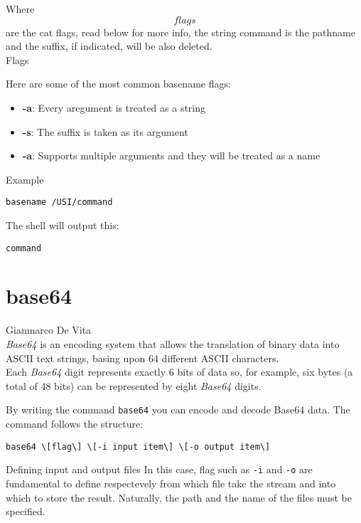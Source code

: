 \documentclass[hidelinks,12pt,a4paper,numbers=enddot]{scrartcl}
\begin{document}
Where \[flags\] are the cat flags, read below for more info, the string command is
the pathname and the suffix, if indicated, will be also deleted.\\

Flags

Here are some of the most common basename flags:

\begin{itemize}
    \item \textbf{-a}: Every aregument is treated as a string 
    \item \textbf{-s}: The suffix is taken as its argument  
    \item \textbf{-a}: Supports multiple arguments and they will be treated as a name 
\end{itemize}

Example

\begin{verbatim}
basename /USI/command
\end{verbatim}

The shell will output this:

\begin{verbatim}
command
\end{verbatim}

\section{base64}


\large Gianmarco De Vita \normalsize\\



\emph{Base64} is an encoding system that allows the translation of binary
data into ASCII text strings, basing upon 64 different ASCII characters.\\
Each \emph{Base64} digit represents exactly 6 bits of data so, for example,
six bytes (a total of 48 bits) can be represented by eight \emph{Base64} digits.

By writing the command \texttt{base64} you can encode and decode Base64 data.
The command follows the structure:

\begin{verbatim}
base64 \[flag\] \[-i input item\] \[-o output item\]
\end{verbatim}

Defining input and output files
In this case, flag such as \texttt{-i} and \texttt{-o} are fundamental
to define respectevely from which file take the stream and into which to store
the result. Naturally, the path and the name of the files must be specified.
\end{document}
